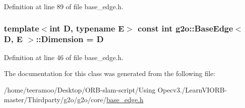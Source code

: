 Definition at line 89 of file base\+\_\+edge.\+h.

\subsubsection[{\texorpdfstring{Dimension}{Dimension}}]{\setlength{\rightskip}{0pt plus 5cm}template$<$int D, typename E$>$ const int {\bf g2o\+::\+Base\+Edge}$<$ D, E $>$\+::Dimension = D\hspace{0.3cm}{\ttfamily [static]}}\hypertarget{classg2o_1_1BaseEdge_ab4812acb21e0b9de80dc6d676e71cb70}{}\label{classg2o_1_1BaseEdge_ab4812acb21e0b9de80dc6d676e71cb70}


Definition at line 46 of file base\+\_\+edge.\+h.



The documentation for this class was generated from the following file\+:\begin{DoxyCompactItemize}
\item 
/home/teeramoo/\+Desktop/\+O\+R\+B-\/slam-\/script/\+Using Opecv3./\+Learn\+V\+I\+O\+R\+B-\/master/\+Thirdparty/g2o/g2o/core/\hyperlink{base__edge_8h}{base\+\_\+edge.\+h}\end{DoxyCompactItemize}
